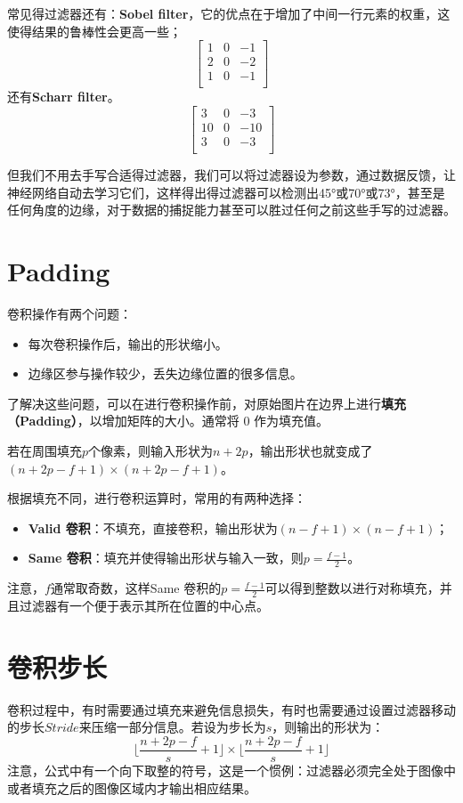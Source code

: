 \documentclass[../../main.tex]{subfiles}
\begin{document}
常见得过滤器还有：\textbf{Sobel filter}，它的优点在于增加了中间一行元素的权重，这使得结果的鲁棒性会更高一些；
\[
    \begin{bmatrix}
        1 & 0 & -1 \\
        2 & 0 & -2 \\
        1 & 0 & -1 \\
    \end{bmatrix}
\]
还有\textbf{Scharr filter}。
\[
    \begin{bmatrix}
        3  & 0 & -3  \\
        10 & 0 & -10 \\
        3  & 0 & -3  \\
    \end{bmatrix}
\]

但我们不用去手写合适得过滤器，我们可以将过滤器设为参数，通过数据反馈，让神经网络自动去学习它们，这样得出得过滤器可以检测出45°或70°或73°，甚至是任何角度的边缘，对于数据的捕捉能力甚至可以胜过任何之前这些手写的过滤器。

\section{Padding}
卷积操作有两个问题：
\begin{itemize}
    \item 每次卷积操作后，输出的形状缩小。
    \item 边缘区参与操作较少，丢失边缘位置的很多信息。
\end{itemize}
了解决这些问题，可以在进行卷积操作前，对原始图片在边界上进行\textbf{填充（Padding）}，以增加矩阵的大小。通常将 0 作为填充值。

若在周围填充\(p\)个像素，则输入形状为\(n+2p\)，输出形状也就变成了\((n+2p-f+1) × (n+2p-f+1)\)。

根据填充不同，进行卷积运算时，常用的有两种选择：
\begin{itemize}
    \item \textbf{Valid 卷积}：不填充，直接卷积，输出形状为\((n-f+1)×(n-f+1)\)；
    \item \textbf{Same 卷积}：填充并使得输出形状与输入一致，则\(p = \frac{f-1}{2}\)。
\end{itemize}
注意，\(f\)通常取奇数，这样Same 卷积的\(p = \frac{f-1}{2}\)可以得到整数以进行对称填充，并且过滤器有一个便于表示其所在位置的中心点。

\section{卷积步长}
卷积过程中，有时需要通过填充来避免信息损失，有时也需要通过设置过滤器移动的\(步长 Stride\)来压缩一部分信息。若设为步长为\(s\)，则输出的形状为：
\[\biggl\lfloor \frac{n+2p-f}{s}+1   \biggr\rfloor \times \biggl\lfloor \frac{n+2p-f}{s}+1 \biggr\rfloor\]
注意，公式中有一个向下取整的符号，这是一个惯例：过滤器必须完全处于图像中或者填充之后的图像区域内才输出相应结果。
\end{document}
